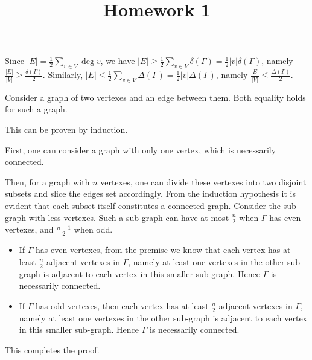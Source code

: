 \documentclass{homework}
\title{Homework 1}
\begin{document}
\maketitle

\begin{problem}{1}
Since $|E| = \frac{1}{2}\sum_{v \in V} \deg{v}$, we have
$|E| \geq \frac{1}{2}\sum_{v \in V} \delta(\Gamma)
= \frac{1}{2}|v| \delta(\Gamma)$, namely
$\frac{|E|}{|V|} \geq \frac{\delta(\Gamma)}{2}$.
Similarly,
$|E| \leq \frac{1}{2}\sum_{v \in V} \Delta(\Gamma)
= \frac{1}{2}|v| \Delta(\Gamma)$, namely
$\frac{|E|}{|V|} \leq \frac{\Delta(\Gamma)}{2}$. \QED

Consider a graph of two vertexes and an edge between them. Both equality holds
for such a graph.
\end{problem}

\begin{problem}{2}
This can be proven by induction.

First, one can consider a graph with only one vertex, which is necessarily
connected. 

Then, for a graph with $n$ vertexes, one can divide these vertexes into two 
disjoint subsets and slice the edges set accordingly.
From the induction hypothesis it is evident that each subset itself constitutes 
a connected graph. Consider the sub-graph with less vertexes. Such a sub-graph
can have at most $\frac{n}{2}$ when $\Gamma$ has even vertexes, and
$\frac{n-1}{2}$ when odd.
\begin{itemize}
\item If $\Gamma$ has even vertexes, from the premise we
know that each vertex has at least $\frac{n}{2}$ adjacent vertexes in
$\Gamma$, namely at least one vertexes in the other sub-graph is adjacent
to each vertex in this smaller sub-graph. Hence $\Gamma$ is necessarily
connected.
\item If $\Gamma$ has odd vertexes, then each vertex has at least $\frac{n}{2}$ 
adjacent vertexes in $\Gamma$, namely at least one vertexes in the other
sub-graph is adjacent to each vertex in this smaller sub-graph.
Hence $\Gamma$ is necessarily connected.
\end{itemize}
This completes the proof.\QED
\end{problem}
\end{document}
